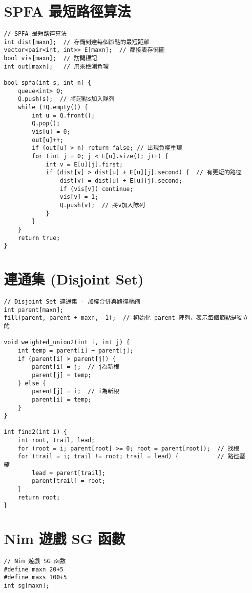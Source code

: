 \documentclass{article}
\begin{document}
\begin{multicols}{2}
\section{SPFA 最短路徑算法}

\begin{lstlisting}
// SPFA 最短路徑算法
int dist[maxn];  // 存儲到達每個節點的最短距離
vector<pair<int, int>> E[maxn];  // 鄰接表存儲圖
bool vis[maxn];  // 訪問標記
int out[maxn];   // 用來檢測負環

bool spfa(int s, int n) {
    queue<int> Q;
    Q.push(s);  // 將起點s加入隊列
    while (!Q.empty()) {
        int u = Q.front();
        Q.pop();
        vis[u] = 0;
        out[u]++;
        if (out[u] > n) return false; // 出現負權重環
        for (int j = 0; j < E[u].size(); j++) {
            int v = E[u][j].first;
            if (dist[v] > dist[u] + E[u][j].second) {  // 有更短的路徑
                dist[v] = dist[u] + E[u][j].second;
                if (vis[v]) continue;
                vis[v] = 1;
                Q.push(v);  // 將v加入隊列
            }
        }
    }
    return true;
}
\end{lstlisting}

\section{連通集 (Disjoint Set)}

\begin{lstlisting}
// Disjoint Set 連通集 - 加權合併與路徑壓縮
int parent[maxn];
fill(parent, parent + maxn, -1);  // 初始化 parent 陣列，表示每個節點是獨立的

void weighted_union2(int i, int j) {
    int temp = parent[i] + parent[j];
    if (parent[i] > parent[j]) {
        parent[i] = j;  // j為新根
        parent[j] = temp;
    } else {
        parent[j] = i;  // i為新根
        parent[i] = temp;
    }
}

int find2(int i) {
    int root, trail, lead;
    for (root = i; parent[root] >= 0; root = parent[root]);  // 找根
    for (trail = i; trail != root; trail = lead) {           // 路徑壓縮
        lead = parent[trail];
        parent[trail] = root;
    }
    return root;
}
\end{lstlisting}

\section{Nim 遊戲 SG 函數}

\begin{lstlisting}
// Nim 遊戲 SG 函數
#define maxn 20+5
#define maxs 100+5
int sg[maxn];


\end{lstlisting}
\end{multicols}
\end{document}
